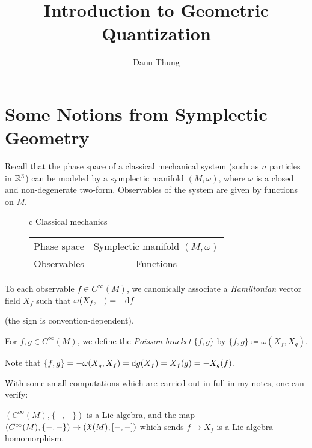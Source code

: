\documentclass[parskip=half]{scrartcl}
\title{Introduction to Geometric Quantization}
\author{Danu Thung}
\date{}
\begin{document}
\maketitle

\section{Some Notions from Symplectic Geometry}

Recall that the phase space of a classical mechanical system (such as $n$ particles in $\mathbb{R}^3$) can be modeled by a symplectic manifold $(M,\omega)$, where $\omega$ is a closed and non-degenerate two-form. Observables of the system are given by functions on $M$.
\begin{figure}[ht!]
	\centering
	\begin{onboard}
	\begin{tabular}{c}
		Classical mechanics \\\hline
		\begin{tabular}{c|c}
			Phase space & Symplectic manifold $(M,\omega)$\\
			Observables & Functions
		\end{tabular}
	\end{tabular}
	\end{onboard}
\end{figure}



\begin{mydef}
	\begin{onboard}
		To each observable $f\in C^\infty(M)$, we canonically associate a \emph{Hamiltonian} vector field $X_f$ such that $\omega(X_f,-)=-\mathrm{d} f$
	\end{onboard} (the sign is convention-dependent).
	\begin{onboard}
		For $f,g\in C^\infty(M)$, we define the \emph{Poisson bracket} $\{f,g\}$ by $\{f,g\}\coloneqq\omega(X_f,X_g)$.
	\end{onboard}
\end{mydef}

\begin{onboard}
	\begin{rem}
	Note that $\{f,g\}=-\omega(X_g,X_f)=\mathrm{d} g(X_f)=X_f(g)=-X_g(f)$.
\end{rem}
\end{onboard}

With some small computations which are carried out in full in my notes, one can verify:
\begin{onboard}
	\begin{lem}
		$(C^\infty(M),\{-,-\})$ is a Lie algebra, and the map $(C^\infty(M),\{-,-\})\to (\mathfrak{X}(M),[-,-])$ which sends $f\mapsto X_f$ is a Lie algebra homomorphism.
	\end{lem}
\end{onboard}
\end{document}
